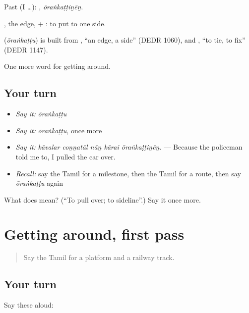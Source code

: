Past (I …): , \emph{ōraṅkaṭṭiṉēṉ}.

, the edge, + : to put to one side.

\begin{cousinweb}
\textbf{} (\emph{ōraṅkaṭṭu}) is built from , \textquotedblleft{}an edge, a side\textquotedblright{} (DEDR 1060), and , \textquotedblleft{}to tie, to fix\textquotedblright{} (DEDR 1147).
\end{cousinweb}

\begin{grammarlens}[title={What you've built}]
One more word for getting around.
\end{grammarlens}

\subsection*{Your turn}
\begin{itemize}
\raggedright
  \item \emph{Say it:} \emph{ōraṅkaṭṭu}
  \item \emph{Say it:} \emph{ōraṅkaṭṭu}, once more
  \item \emph{Say it:} \emph{kāvalar coṉṉatāl nāṉ kārai ōraṅkaṭṭiṉēṉ.} — Because the policeman told me to, I pulled the car over.
  \item \emph{Recall:} say the Tamil for a milestone, then the Tamil for a route, then say \emph{ōraṅkaṭṭu} again
\end{itemize}

\begin{tcolorbox}[breakable,colback=teal!4,colframe=teal!35!black,title={Before you move on}]
What does  mean? (\textquotedblleft{}To pull over; to sideline\textquotedblright{}.) Say it once more.
\end{tcolorbox}
\section[(dialogue)]{Getting around, first pass}

\label{lesson:TA-R407-review-400-407}



\begin{quote}
Say the Tamil for a platform and a railway track.
\end{quote}

\subsection*{Your turn}
Say these aloud:

